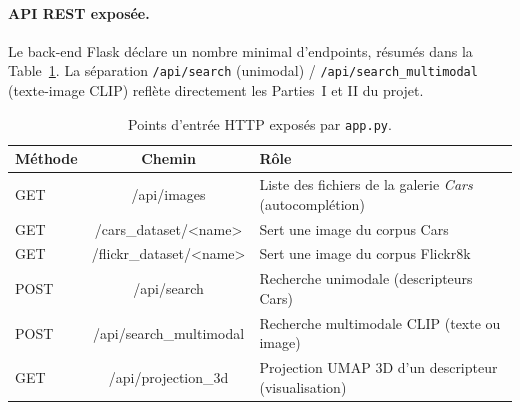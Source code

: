 \documentclass[a4paper,11pt]{article}
\begin{document}
\paragraph{API REST exposée.}
Le back-end Flask déclare un nombre minimal d'endpoints, résumés dans la
Table~\ref{tab:api}. La séparation \texttt{/api/search} (unimodal) /
\texttt{/api/search\_multimodal} (texte-image CLIP) reflète directement
les Parties~I et II du projet.

\begin{table}[H]
\centering
\small
\renewcommand{\arraystretch}{1.15}
\begin{tabular}{>{\ttfamily}l>{\ttfamily}cl}
\toprule
\textnormal{Méthode} & \textnormal{Chemin} & \textnormal{Rôle} \\
\midrule
GET  & /api/images            & Liste des fichiers de la galerie \textit{Cars} (autocomplétion) \\
GET  & /cars\_dataset/<name>  & Sert une image du corpus Cars \\
GET  & /flickr\_dataset/<name>& Sert une image du corpus Flickr8k \\
POST & /api/search            & Recherche unimodale (descripteurs Cars) \\
POST & /api/search\_multimodal& Recherche multimodale CLIP (texte ou image) \\
GET  & /api/projection\_3d    & Projection UMAP 3D d'un descripteur (visualisation) \\
\bottomrule
\end{tabular}
\caption{Points d'entrée HTTP exposés par \texttt{app.py}.}
\label{tab:api}
\end{table}
\end{document}
